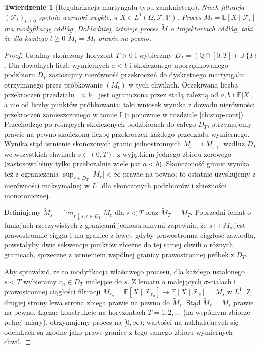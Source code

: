 \documentclass[11pt,a4paper,oneside]{report}
\numberwithin{equation}{chapter}
\theoremstyle{plain}
\newtheorem{twierdzenie}{Twierdzenie}[chapter]
\theoremstyle{definition}
\theoremstyle{remark}
\newcommand{\Q}{\mathbb{Q}}
\newcommand{\Prob}{\mathbb{P}}
\newcommand{\E}{\mathbb{E}}
\newcommand{\calF}{\mathcal{F}}
\begin{document}
\begin{twierdzenie}[Regularizacja martyngału typu zamkniętego]
\label{thm:regularizacja}
Niech filtracja $(\calF_t)_{t\ge0}$ spełnia warunki zwykłe,
a $X\in L^1(\Omega,\calF,\Prob)$. Proces
$M_t=\E[X\mid\calF_t]$ ma modyfikację c\`adl\`ag.
Dokładniej, istnieje proces $\widetilde M$ o trajektoriach
c\`adl\`ag, taki że dla każdego $t\ge0$
$\widetilde M_t=M_t$ prawie na pewno.
\end{twierdzenie}
\begin{proof}
Ustalmy skończony horyzont $T>0$ i wybierzmy
$D_T=(\Q\cap[0,T])\cup\{T\}$. Dla dowolnych liczb
wymiernych $a<b$ i skończonego uporządkowanego podzbioru
$D_T$ zastosujmy nierówność przekroczeń do dyskretnego
martyngału otrzymanego przez próbkowanie $(M_t)$ w tych
chwilach. Oczekiwana liczba przekroczeń przedziału
$[a,b]$ jest ograniczona przez stałą zależną od
$a,b$ i $\E|X|$, a nie od liczby punktów próbkowania:
taki wniosek wynika z dowodu nierówności przekroczeń
zamieszczonego w tomie I (i ponownie w rozdziale
\ref{ch:stop-cont}). Przechodząc po rosnących skończonych
podzbiorach do całego $D_T$, otrzymujemy prawie na pewno
skończoną liczbę przekroczeń każdego przedziału
wymiernego. Wynika stąd istnienie skończonych granic
jednostronnych $M_{s-}$ i $M_{s+}$ wzdłuż $D_T$
we wszystkich chwilach $s\in(0,T)$, z wyjątkiem jednego
zbioru zerowego (zastosowaliśmy tylko przeliczalnie wiele
par $a<b$). Skończoność granic wynika też z ograniczenia
$\sup_{r\in D_T}|M_r|<\infty$ prawie na pewno;
to ostatnie uzyskujemy z nierówności maksymalnej w $L^1$
dla skończonych podzbiorów i zbieżności monotonicznej.

Definiujemy $\widetilde M_s=\lim_{r\downarrow s,r\in D_T}M_r$
dla $s<T$ oraz $\widetilde M_T=M_T$. Poprzedni lemat
o funkcjach rzeczywistych z granicami jednostronnymi
zapewnia, że $s\mapsto\widetilde M_s$ jest prawostronnie
ciągła i ma granice z lewej: gdyby prawostronna ciągłość
zawiodła, powstałyby dwie sekwencje punktów zbieżne do
tej samej chwili o różnych granicach, sprzeczne z istnieniem
wspólnej granicy prawostronnej próbek z $D_T$.

Aby sprawdzić, że to modyfikacja właściwego procesu, dla
każdego ustalonego $s<T$ wybieramy $r_n\in D_T$ malejące
do $s$. Z lematu o malejących $\sigma$-ciałach i prawostronnej
ciągłości filtracji
$M_{r_n}=\E[X\mid\calF_{r_n}]\to
\E[X\mid\calF_s]=M_s$ w $L^1$.
Z drugiej strony lewa strona zbiega prawie na pewno do
$\widetilde M_s$. Stąd $\widetilde M_s=M_s$ prawie na pewno.
Łącząc konstrukcje na horyzontach $T=1,2,\ldots$
(na wspólnym zbiorze pełnej miary), otrzymujemy proces
na $[0,\infty)$; wartości na nakładających się odcinkach
są zgodne jako prawe granice z tego samego zbioru
wymiernych chwil.
\end{proof}
\end{document}
